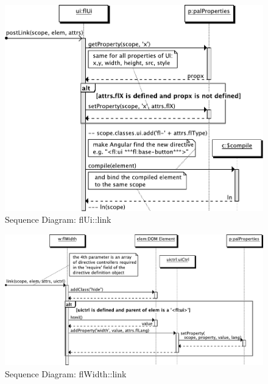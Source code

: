 \begin{figure}[htb]
    \centering
    \includegraphics{figures/design/seqdia/ui-link.pdf}
    \caption{Sequence Diagram: flUi::link}
    \label{fig:design-seqdia-ui-link}
\end{figure}

\begin{figure}
    \centering
    \includegraphics{figures/design/seqdia/width-link.pdf}
    \caption{Sequence Diagram: flWidth::link}
    \label{fig:design-seqdia-width-link}
\end{figure}


